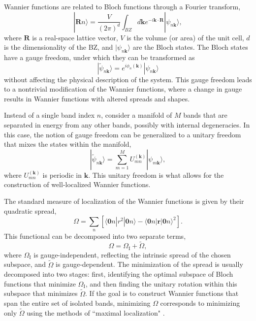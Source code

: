 \documentclass[galley,aps,pra,10pt,amsmath,amssymb,
    superscriptaddress,nofootinbib,longbibliography]{revtex4-2}
\begin{document}
Wannier functions are related to Bloch functions through a Fourier transform,
\begin{equation}
    |\mathbf{R} n\rangle = \frac{V}{(2\pi)^d} \int_{BZ} d\mathbf{k} e^{-i\mathbf{k}\cdot \mathbf{R}} |\psi_{n\mathbf{k}}\rangle,
\end{equation}
where $\mathbf{R}$ is a real-space lattice vector, $V$ is the volume (or area) of the unit cell, $d$ is the dimensionality of the BZ, and $|\psi_{n\mathbf{k}}\rangle$ are the Bloch states. The Bloch states have a gauge freedom, under which they can be transformed as
\begin{equation}
    |\tilde{\psi}_{n\mathbf{k}}\rangle = e^{i\phi_n(\mathbf{k})} |\psi_{n\mathbf{k}}\rangle
\end{equation}
without affecting the physical description of the system. This gauge freedom leads to a nontrivial modification of the Wannier functions, where a change in gauge results in Wannier functions with altered spreads and shapes.

Instead of a single band index $n$, consider a manifold of $M$ bands that are separated in energy from any other bands, possibly with internal degeneracies. In this case, the notion of gauge freedom can be generalized to a unitary freedom that mixes the states within the manifold,
\begin{equation}
    |\tilde{\psi}_{n\mathbf{k}}\rangle = \sum_{m=1}^{M} U_{mn}^{(\mathbf{k})} |\psi_{m\mathbf{k}} \rangle ,
\end{equation}
where $U_{mn}^{(\mathbf{k})}$ is periodic in $\mathbf{k}$. This unitary freedom is what allows for the construction of well-localized Wannier functions. 

The standard measure of localization of the Wannier functions is given by their quadratic spread,
\begin{equation}
    \Omega = \sum_n \left[ \langle \mathbf{0} n | r^2 | \mathbf{0}n \rangle - \langle \mathbf{0} n | \mathbf{r} | \mathbf{0} n \rangle^2 \right].
\end{equation}
This functional can be decomposed into two separate terms,
\begin{equation}
    \Omega = \Omega_\textrm{I} + \widetilde{\Omega},
\end{equation}
where $\Omega_\textrm{I}$ is gauge-independent, reflecting the intrinsic spread of the chosen subspace, and $\widetilde{\Omega}$ is gauge-dependent. The minimization of the spread is usually decomposed into two stages: first, identifying the optimal subspace of Bloch functions that minimize $\Omega_\textrm{I}$, and then finding the unitary rotation within this subspace that minimizes $\widetilde{\Omega}$. If the goal is to construct Wannier functions that span the entire set of isolated bands, minimizing $\Omega$ corresponds to minimizing only $\widetilde{\Omega}$ using the methods of ``maximal localization" \cite{marzari1997}.  
\end{document}
